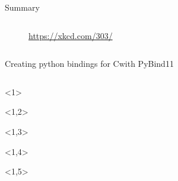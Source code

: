 \documentclass[@BEAMER_OPTIONS@]{beamer}
\newcommand{\CXX}{{\rm C}\plusplus}
\newcommand{\www}[1]{\href{#1}{#1}}
\begin{document}
\begin{frame}[fragile]{Summary}
\begin{columns}
\begin{column}[t]{0.35\textwidth}
\begin{uncoverenv}
\begin{figure}
                    \caption{\tiny \www{https://xkcd.com/303/}}
                \end{figure}
            \end{uncoverenv}
        \end{column}
    \end{columns}
\end{frame}

\begin{frame}[fragile]{Creating python bindings for \CXX with PyBind11}
    \vspace{-0.5\baselineskip}
    \begin{columns}
        \begin{column}[c]{0.25\textwidth}
            \begin{exampleblock}{}
                \begin{adjustbox}{width=0.28\textwidth, height=\textheight, keepaspectratio}
                    \begin{minipage}{\textwidth}
                        \begin{uncoverenv}<1>
                            
                        \end{uncoverenv}
                        \begin{uncoverenv}<1,2>
                            
                        \end{uncoverenv}
                        \begin{uncoverenv}<1,3>
                            
                        \end{uncoverenv}
                        \begin{uncoverenv}<1,4>
                            
                        \end{uncoverenv}
                        \begin{uncoverenv}<1,5>
                            
                        \end{uncoverenv}
                    \end{minipage}
                \end{adjustbox}

\end{exampleblock}
\end{column}
\end{columns}
\end{frame}
\end{document}
